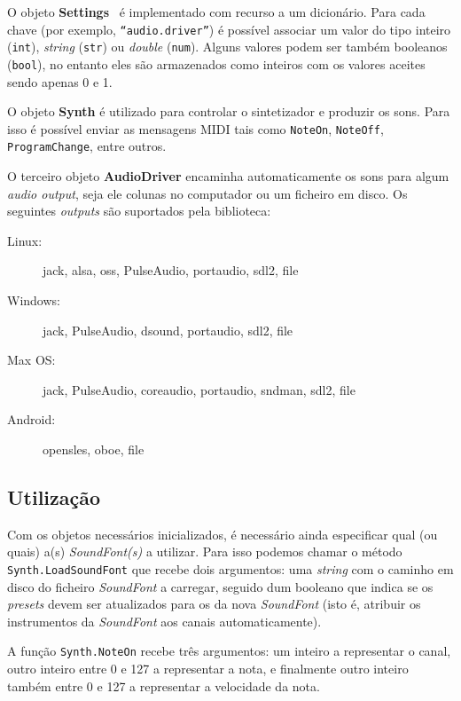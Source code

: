 O objeto \textbf{Settings}~\citep{fluidsynth_settings} é implementado com recurso a um dicionário. Para cada chave (por exemplo, \texttt{``audio.driver''}) é possível associar um valor do tipo inteiro (\texttt{int}), \textit{string} (\texttt{str}) ou \textit{double} (\texttt{num}). Alguns valores podem ser também booleanos (\texttt{bool}), no entanto eles são armazenados como inteiros com os valores aceites sendo apenas 0 e 1.

O objeto \textbf{Synth} é utilizado para controlar o sintetizador e produzir os sons. Para isso é possível enviar as mensagens MIDI tais como \texttt{NoteOn}, \texttt{NoteOff}, \texttt{ProgramChange}, entre outros.

O terceiro objeto \textbf{AudioDriver} encaminha automaticamente os sons para algum \textit{audio output}, seja ele colunas no computador ou um ficheiro em disco. Os seguintes \textit{outputs} são suportados pela biblioteca:

\begin{adjustwidth}{20pt}{20pt}
\begin{description}
    \item[Linux:] jack, alsa, oss, PulseAudio, portaudio, sdl2, file
    \item[Windows:] jack, PulseAudio, dsound, portaudio, sdl2, file
    \item[Max OS:] jack, PulseAudio, coreaudio, portaudio, sndman, sdl2, file
    \item[Android:] opensles, oboe, file
\end{description}
\end{adjustwidth}

\subsection{Utilização}
Com os objetos necessários inicializados, é necessário ainda especificar qual (ou quais) a(s) \textit{SoundFont(s)} a utilizar. Para isso podemos chamar o método \texttt{Synth.LoadSoundFont} que recebe dois argumentos: uma \textit{string} com o caminho em disco do ficheiro \textit{SoundFont} a carregar, seguido dum booleano que indica se os \textit{presets} devem ser atualizados para os da nova \textit{SoundFont} (isto é, atribuir os instrumentos da \textit{SoundFont} aos canais automaticamente).

A função \texttt{Synth.NoteOn} recebe três argumentos: um inteiro a representar o canal, outro inteiro entre 0 e 127 a representar a nota, e finalmente outro inteiro também entre 0 e 127 a representar a velocidade da nota.

